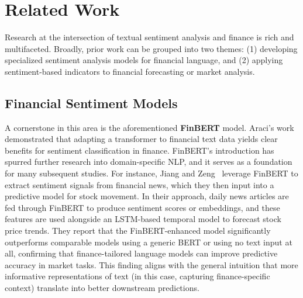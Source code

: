 \documentclass[12pt]{article}
\begin{document}
\section{Related Work}
Research at the intersection of textual sentiment analysis and finance is rich and multifaceted. Broadly,
prior work can be grouped into two themes: (1) developing specialized sentiment analysis models for financial
language, and (2) applying sentiment-based indicators to financial forecasting or market analysis.

\subsection{Financial Sentiment Models}
A cornerstone in this area is the aforementioned \textbf{FinBERT} model.
Araci's work~\cite{araci2019finbert} demonstrated that adapting a transformer to financial text data yields
clear benefits for sentiment classification in finance. FinBERT's introduction has spurred further research
into domain-specific NLP, and it serves as a foundation for many subsequent studies. For instance, Jiang and
Zeng~\cite{jiang2025financialsentiment} leverage FinBERT to extract sentiment signals from financial news,
which they then input into a predictive model for stock movement. In their approach, daily news articles are
fed through FinBERT to produce sentiment scores or embeddings, and these features are used alongside an
LSTM-based temporal model to forecast stock price trends. They report that the FinBERT-enhanced model
significantly outperforms comparable models using a generic BERT or using no text input at all, confirming
that finance-tailored language models can improve predictive accuracy in market tasks. This finding aligns
with the general intuition that more informative representations of text (in this case, capturing
finance-specific context) translate into better downstream predictions.
\end{document}
